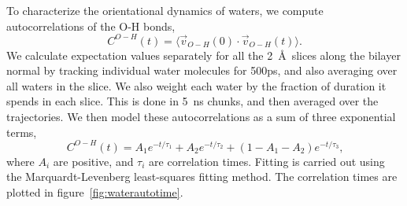 \documentclass[12pt,openany,final]{book}
\begin{document}
To characterize the orientational dynamics of waters, we compute autocorrelations of the O-H bonds,
\begin{equation}
\label{eq:autocorr}
C^{O-H} (t) =\bigg \langle \vec{v}_{O-H}(0) \cdot \vec{v}_{O-H}(t) \bigg \rangle\text{.}
\end{equation}
We calculate expectation values separately for all the 2~\AA~slices along 
the bilayer normal by tracking individual water molecules for 500ps, and also averaging over all 
waters in the slice. We also weight each water by the fraction of duration it spends in each slice. This is done in 5~ns chunks, and then averaged over the trajectories. 
We then model these autocorrelations as a sum of three exponential terms,
\begin{equation}
\label{eq:fit}
C^{O-H} (t) = A_1 e^{-t/\tau_1} + A_2 e^{-t/\tau_2} + (1 - A_1 - A_2) e^{-t/\tau_3}\text{,}
\end{equation}
where $A_i$ are positive, and $\tau_i$ are correlation times. Fitting is carried out using the 
Marquardt-Levenberg least-squares fitting method. The correlation times are plotted in figure~\ref{fig:waterautotime}. 
\end{document}

